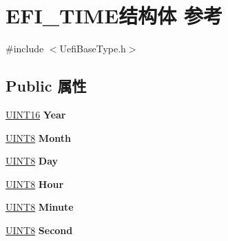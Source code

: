\hypertarget{struct_e_f_i___t_i_m_e}{}\section{E\+F\+I\+\_\+\+T\+I\+M\+E结构体 参考}
\label{struct_e_f_i___t_i_m_e}


{\ttfamily \#include $<$Uefi\+Base\+Type.\+h$>$}

\subsection*{Public 属性}
\begin{DoxyCompactItemize}
\item 
\mbox{\label{struct_e_f_i___t_i_m_e_a83ef4c458d918212358239fe4151e6ce}} 
\hyperlink{_processor_bind_8h_a09f1a1fb2293e33483cc8d44aefb1eb1}{U\+I\+N\+T16} {\bfseries Year}
\item 
\mbox{\label{struct_e_f_i___t_i_m_e_aa3b5112b90ef4ba143a0f4cac629b7e3}} 
\hyperlink{_processor_bind_8h_ab27e9918b538ce9d8ca692479b375b6a}{U\+I\+N\+T8} {\bfseries Month}
\item 
\mbox{\label{struct_e_f_i___t_i_m_e_a7c2b2c1810a6594259b7629d8c993579}} 
\hyperlink{_processor_bind_8h_ab27e9918b538ce9d8ca692479b375b6a}{U\+I\+N\+T8} {\bfseries Day}
\item 
\mbox{\label{struct_e_f_i___t_i_m_e_a78630759c70cb327d76f54120ba89b64}} 
\hyperlink{_processor_bind_8h_ab27e9918b538ce9d8ca692479b375b6a}{U\+I\+N\+T8} {\bfseries Hour}
\item 
\mbox{\label{struct_e_f_i___t_i_m_e_a7ac42e4090d55927ad83616ae8e960c7}} 
\hyperlink{_processor_bind_8h_ab27e9918b538ce9d8ca692479b375b6a}{U\+I\+N\+T8} {\bfseries Minute}
\item 
\mbox{\label{struct_e_f_i___t_i_m_e_a1d787842c2d55c08f909e376e87faf31}} 
\hyperlink{_processor_bind_8h_ab27e9918b538ce9d8ca692479b375b6a}{U\+I\+N\+T8} {\bfseries Second}
\item 
\mbox{\label{struct_e_f_i___t_i_m_e_a4d37c0a52f272fa97011dfda8c988001}} 

\end{DoxyCompactItemize}
